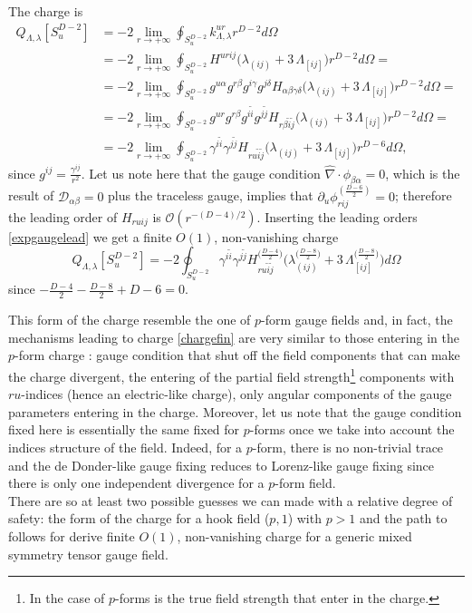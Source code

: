 \documentclass[a4paper,12pt]{article}
\begin{document}
The charge is 
\begin{equation}
\begin{aligned}
Q_{\Lambda, \lambda}[S^{D-2}_u]&=-2\lim_{r \rightarrow +\infty}\oint_{S^{D-2}_u} k^{ur}_{\Lambda, \lambda}r^{D-2}d\Omega\\
&=-2\lim_{r \rightarrow +\infty}\oint_{S^{D-2}_u}H^{u r i j}\bigl(\lambda_{(i j)}+3\,\Lambda_{[i j]}\bigr)r^{D-2}d\Omega=\\
&=-2\lim_{r \rightarrow +\infty}\oint_{S^{D-2}_u}g^{u \alpha}g^{r\beta}g^{i\gamma}g^{j\delta}H_{\alpha \beta \gamma \delta}\bigl(\lambda_{(i j)}+3\,\Lambda_{[i j]}\bigr)r^{D-2}d\Omega=\\
&=-2\lim_{r \rightarrow +\infty}\oint_{S^{D-2}_u}g^{u r}g^{r\beta}g^{i\tilde{i}}g^{j\tilde{j}}H_{r \beta \tilde{i} \tilde{j}}\bigl(\lambda_{(i j)}+3\,\Lambda_{[i j]}\bigr)r^{D-2}d\Omega=\\
&=-2\lim_{r \rightarrow +\infty}\oint_{S^{D-2}_u}\gamma^{i\tilde{i}}\gamma^{j\tilde{j}}H_{r u \tilde{i} \tilde{j}}\bigl(\lambda_{(i j)}+3\,\Lambda_{[i j]}\bigr)r^{D-6}d\Omega,
\end{aligned}
\end{equation}
since $g^{ij}=\frac{\gamma^{ij}}{r^2}$. Let us note here that the gauge condition $\hat{\nabla} \cdot \phi_{ \beta \alpha}=0$, which is the result of $\mathcal{D}_{\alpha \beta}=0$ plus the traceless gauge, implies that $\partial_u\phi_{rij}^{(\frac{D-6}{2})}=0$; therefore the leading order of $H_{ruij}$ is $\mathcal{O}(r^{-(D-4)/2})$. Inserting the leading orders \eqref{expgaugelead} we get a finite $O(1)$, non-vanishing charge
\begin{equation}
    Q_{\Lambda, \lambda}[S^{D-2}_u]= -2\oint_{S^{D-2}_u}\gamma^{i\tilde{i}}\gamma^{j\tilde{j}}H^{\big(\frac{D-4}{2}\big)}_{r u \tilde{i} \tilde{j}}\bigg(\lambda^{\big(\frac{D-8}{2}\big)}_{(i j)}+3\,\Lambda^{\big(\frac{D-8}{2}\big)}_{[i j]}\bigg)d\Omega
    \label{chargefin}
\end{equation}
since $-\frac{D-4}{2}-\frac{D-8}{2}+D-6=0$.

This form of the charge resemble the one of $p$-form gauge fields and, in fact, the mechanisms leading to charge \eqref{chargefin} are very similar to those entering in the $p$-form charge \cite{manz2, Manzoni:2024tow}: gauge condition that shut off the field components that can make the charge divergent, the entering of the partial field strength\footnote{In the case of $p$-forms is the true field strength that enter in the charge.} components with $ru$-indices (hence an electric-like charge), only angular components of the gauge parameters entering in the charge. Moreover, let us note that the gauge condition fixed here is essentially the same fixed for $p$-forms once we take into account the indices structure of the field. Indeed, for a $p$-form, there is no non-trivial trace and the de Donder-like gauge fixing reduces to Lorenz-like gauge fixing since there is only one independent divergence for a $p$-form field. \\
There are so at least two possible guesses we can made with a relative degree of safety: the form of the charge for a hook field ($p,1$) with $p>1$ and the path to follows for derive finite $O(1)$, non-vanishing charge for a generic mixed symmetry tensor gauge field. 
\end{document}
